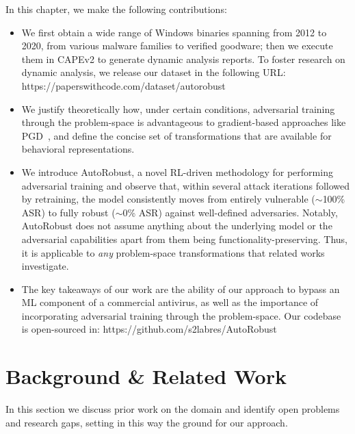 In this chapter, we make the following contributions:
\begin{itemize}
    \item We first obtain a wide range of Windows binaries spanning from 2012 to 2020, from various malware families to verified goodware; then we execute them in CAPEv2 to generate dynamic analysis reports. To foster research on dynamic analysis, we release our dataset in the following URL: https://paperswithcode.com/dataset/autorobust
    \item We justify theoretically how, under certain conditions, adversarial training through the problem-space is advantageous to gradient-based approaches like PGD~\cite{madry2017towards}, and define the concise set of transformations that are available for behavioral representations.
    \item We introduce AutoRobust, a novel RL-driven methodology for performing adversarial training and observe that, within several attack iterations followed by retraining, the model consistently moves from entirely vulnerable ($\sim$100\% ASR) to fully robust ($\sim$0\% ASR) against well-defined adversaries. Notably, AutoRobust does not assume anything about the underlying model or the adversarial capabilities apart from them being functionality-preserving. Thus, it is applicable to \textit{any} problem-space transformations that related works investigate.
    \item The key takeaways of our work are the ability of our approach to bypass an ML component of a commercial antivirus, as well as the importance of incorporating adversarial training through the problem-space. Our codebase is open-sourced in: https://github.com/s2labres/AutoRobust
\end{itemize}

\section{Background \& Related Work}
\label{sec:backgroundauto}
In this section we discuss prior work on the domain and identify open problems and research gaps, setting in this way the ground for our approach.

